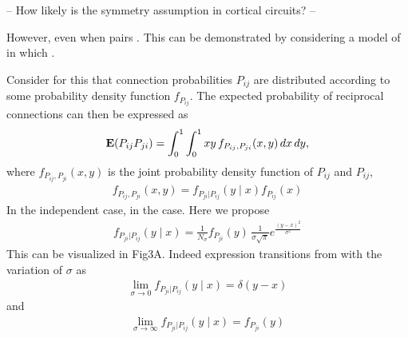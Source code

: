 
-- How likely is the symmetry assumption in cortical circuits? --

However, even when pairs . This can be demonstrated by considering a model of in which .

Consider for this that connection probabilities $P_{ij}$ are distributed according to some probability density function $f_{P_{ij}}$. The expected probability of reciprocal connections can then be expressed as
%
\begin{align}
  \operatorname{\mathbf{E}}(P_{ij}P_{ji}) = \int_0^1 \int_0^1 xy\, f_{P_{ij},P_{ji}}(x,y) \, dx\, dy,
\end{align}
%
where $f_{P_{ij},P_{ji}}(x,y)$ is the joint probability density function of $P_{ij}$ and $P_{ij}$, 
%
\begin{align}
  f_{P_{ij},P_{ji}}(x,y) =  f_{P_{ji} | P_{ij}}(y \mid x) f_{P_{ij}}(x)
\end{align}
%
In the independent case, in the case. Here we propose
%
\begin{align}
  f_{P_{ji}|P_{ij}} (y \mid x) = \frac{1}{N_{\sigma}} f_{P_{ji}}(y)\, \frac{1}{\sigma \sqrt{\pi}} e^{\frac{(y-x)^2}{\sigma^2}}
\end{align}
%
This can be visualized in Fig3A. Indeed expression transitions from with the variation of $\sigma$ as
\begin{align}
  \lim_{\sigma \to 0}   f_{P_{ji}|P_{ij}} (y \mid x) = \delta(y-x)
\end{align} 
%
and
%
\begin{align}
  \lim_{\sigma \to \infty}   f_{P_{ji}|P_{ij}} (y \mid x) = f_{P_{ji}}(y)
\end{align}


